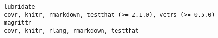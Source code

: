 \documentclass[
  letterpaper,
  DIV=11,
  numbers=noendperiod]{scrreprt}
\begin{document}
\begin{verbatim}
lubridate                                                                                                                                                                                                                                                                                                                                                                                                                                                                                                                                                                                                                                                                                                                                                                                                                                                                                                                                                                                                                                                                                                                                                                                                                                       covr, knitr, rmarkdown, testthat (>= 2.1.0), vctrs (>= 0.5.0)
magrittr                                                                                                                                                                                                                                                                                                                                                                                                                                                                                                                                                                                                                                                                                                                                                                                                                                                                                                                                                                                                                                                                                                                                                                                                                                                              covr, knitr, rlang, rmarkdown, testthat

\end{verbatim}
\end{document}
